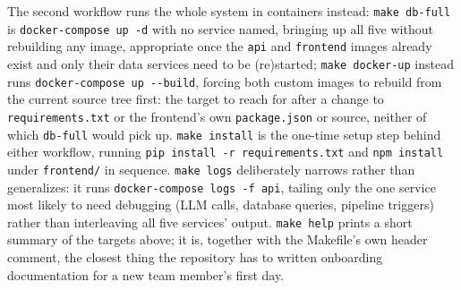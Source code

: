 \begin{sloppypar}
The second workflow runs the whole system in containers instead: \texttt{make db-full} is \texttt{docker-compose up -d} with no service named, bringing up all five without rebuilding any image, appropriate once the \texttt{api} and \texttt{frontend} images already exist and only their data services need to be (re)started; \texttt{make docker-up} instead runs \texttt{docker-compose up -{}-build}, forcing both custom images to rebuild from the current source tree first: the target to reach for after a change to \texttt{requirements.txt} or the frontend's own \texttt{package.json} or source, neither of which \texttt{db-full} would pick up. \texttt{make install} is the one-time setup step behind either workflow, running \texttt{pip install -r requirements.txt} and \texttt{npm install} under \texttt{frontend/} in sequence. \texttt{make logs} deliberately narrows rather than generalizes: it runs \texttt{docker-compose logs -f api}, tailing only the one service most likely to need debugging (LLM calls, database queries, pipeline triggers) rather than interleaving all five services' output. \texttt{make help} prints a short summary of the targets above; it is, together with the Makefile's own header comment, the closest thing the repository has to written onboarding documentation for a new team member's first day.
\end{sloppypar}

